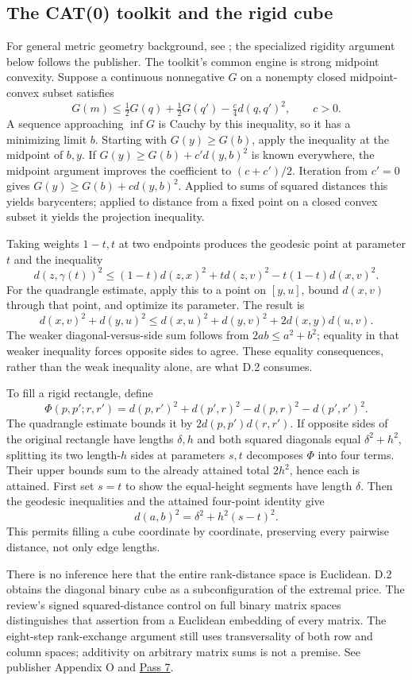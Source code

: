 \documentclass[11pt,letterpaper]{article}
\theoremstyle{definition}\newtheorem{definition}[theorem]{Definition}\newtheorem{example}[theorem]{Example}
\theoremstyle{remark}\newtheorem{remark}[theorem]{Remark}
\newcommand{\aud}[2]{\href{https://github.com/nousentllc/VP-VNP-Review/blob/567303d0bcf4f9d54390437b137752446e58ccd6/#1}{#2}}
\begin{document}
\subsection{The CAT(0) toolkit and the rigid cube}\label{sec:toolkitdetail}
For general metric geometry background, see \cite{bridsonHaefliger}; the specialized rigidity argument below follows the publisher.
The toolkit's common engine is strong midpoint convexity. Suppose a continuous nonnegative $G$ on a nonempty closed midpoint-convex subset satisfies
\[
 G(m)\le\tfrac12G(q)+\tfrac12G(q')-\tfrac c4d(q,q')^2,\qquad c>0.
\]
A sequence approaching $\inf G$ is Cauchy by this inequality, so it has a minimizing limit $b$. Starting with $G(y)\ge G(b)$, apply the inequality at the midpoint of $b,y$. If $G(y)\ge G(b)+c'd(y,b)^2$ is known everywhere, the midpoint argument improves the coefficient to $(c+c')/2$. Iteration from $c'=0$ gives $G(y)\ge G(b)+c d(y,b)^2$. Applied to sums of squared distances this yields barycenters; applied to distance from a fixed point on a closed convex subset it yields the projection inequality.

Taking weights $1-t,t$ at two endpoints produces the geodesic point at parameter $t$ and the inequality
\[
 d(z,\gamma(t))^2\le (1-t)d(z,x)^2+t d(z,v)^2-t(1-t)d(x,v)^2.
\]
For the quadrangle estimate, apply this to a point on $[y,u]$, bound $d(x,v)$ through that point, and optimize its parameter. The result is
\[
 d(x,v)^2+d(y,u)^2\le d(x,u)^2+d(y,v)^2+2d(x,y)d(u,v).
\]
The weaker diagonal-versus-side sum follows from $2ab\le a^2+b^2$; equality in that weaker inequality forces opposite sides to agree. These equality consequences, rather than the weak inequality alone, are what D.2 consumes.

To fill a rigid rectangle, define
\[
 \Phi(p,p';r,r')=d(p,r')^2+d(p',r)^2-d(p,r)^2-d(p',r')^2.
\]
The quadrangle estimate bounds it by $2d(p,p')d(r,r')$. If opposite sides of the original rectangle have lengths $\delta,h$ and both squared diagonals equal $\delta^2+h^2$, splitting its two length-$h$ sides at parameters $s,t$ decomposes $\Phi$ into four terms. Their upper bounds sum to the already attained total $2h^2$, hence each is attained. First set $s=t$ to show the equal-height segments have length $\delta$. Then the geodesic inequalities and the attained four-point identity give
\[
 d(a,b)^2=\delta^2+h^2(s-t)^2.
\]
This permits filling a cube coordinate by coordinate, preserving every pairwise distance, not only edge lengths.

There is no inference here that the entire rank-distance space is Euclidean. D.2 obtains the diagonal binary cube as a subconfiguration of the extremal price. The review's signed squared-distance control on full binary matrix spaces distinguishes that assertion from a Euclidean embedding of every matrix. The eight-step rank-exchange argument still uses transversality of both row and column spaces; additivity on arbitrary matrix sums is not a premise. See publisher Appendix O and \aud{passes/07-field-alternative.md}{Pass 7}.
\end{document}
